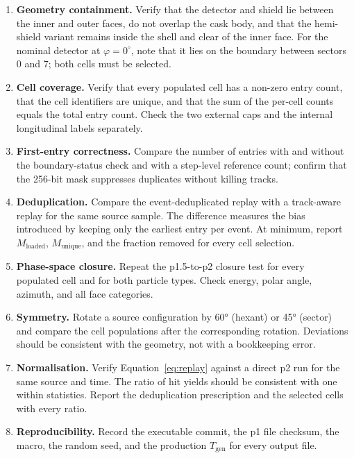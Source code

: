 \documentclass[11pt,a4paper]{article}
\begin{document}
\begin{enumerate}
  \item \textbf{Geometry containment.} Verify that the detector and shield lie
        between the inner and outer faces, do not overlap the cask body, and
        that the hemi-shield variant remains inside the shell and clear of the
        inner face. For the nominal detector at $\varphi=0^\circ$, note that it
        lies on the boundary between sectors 0 and 7; both cells must be
        selected.
  \item \textbf{Cell coverage.} Verify that every populated cell has a non-zero
        entry count, that the cell identifiers are unique, and that the sum of
        the per-cell counts equals the total entry count. Check the two
        external caps and the internal longitudinal labels separately.
  \item \textbf{First-entry correctness.} Compare the number of entries with
        and without the boundary-status check and with a step-level reference
        count; confirm that the 256-bit mask suppresses duplicates without
        killing tracks.
  \item \textbf{Deduplication.} Compare the event-deduplicated replay with a
        track-aware replay for the same source sample. The difference measures
        the bias introduced by keeping only the earliest entry per event. At
        minimum, report $M_{\mathrm{loaded}}$, $M_{\mathrm{unique}}$, and the
        fraction removed for every cell selection.
  \item \textbf{Phase-space closure.} Repeat the p1.5-to-p2 closure test for
        every populated cell and for both particle types. Check energy, polar
        angle, azimuth, and all face categories.
  \item \textbf{Symmetry.} Rotate a source configuration by \ang{60} (hexant)
        or \ang{45} (sector) and compare the cell populations after the
        corresponding rotation. Deviations should be consistent with the
        geometry, not with a bookkeeping error.
  \item \textbf{Normalisation.} Verify Equation~\eqref{eq:replay} against a
        direct p2 run for the same source and time. The ratio of hit yields
        should be consistent with one within statistics. Report the
        deduplication prescription and the selected cells with every ratio.
  \item \textbf{Reproducibility.} Record the executable commit, the p1 file
        checksum, the macro, the random seed, and the production
        $T_{\mathrm{gen}}$ for every output file.
\end{enumerate}
\end{document}
